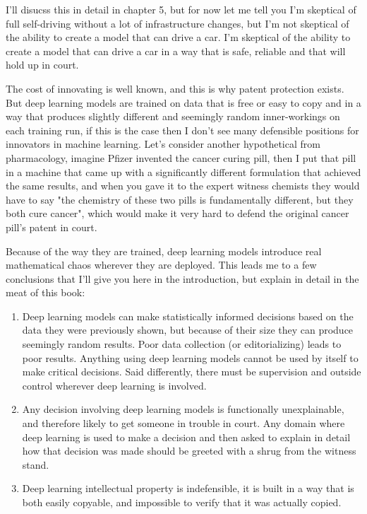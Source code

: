 I'll disucss this in detail in chapter 5, but for now let me tell you I'm skeptical of full self-driving without a lot of infrastructure changes, but I'm not skeptical of the ability to create a model that can drive a car. I'm skeptical of the ability to create a model that can drive a car in a way that is safe, reliable and that will hold up in court.   

The cost of innovating is well known, and this is why patent protection exists. But deep learning models are trained on data that is free or easy to copy and in a way that produces slightly different and seemingly random inner-workings on each training run, if this is the case then I don't see many defensible positions for innovators in machine learning. Let's consider another hypothetical from pharmacology, imagine Pfizer invented the cancer curing pill, then I put that pill in a machine that came up with a significantly different formulation that achieved the same results, and when you gave it to the expert witness chemists they would have to say "the chemistry of these two pills is fundamentally different, but they both cure cancer", which would make it very hard to defend the original cancer pill's patent in court.

Because of the way they are trained, deep learning models introduce real mathematical chaos wherever they are deployed. This leads me to a few conclusions that I'll give you here in the introduction, but explain in detail in the meat of this book: 

\begin{enumerate}
\item Deep learning models can make statistically informed decisions based on the data they were previously shown, but because of their size they can produce seemingly random results. Poor data collection (or editorializing) leads to poor results. Anything using deep learning models cannot be used by itself to make critical decisions. Said differently, there must be supervision and outside control wherever deep learning is involved.
\item Any decision involving deep learning models is functionally unexplainable, and therefore likely to get someone in trouble in court. Any domain where deep learning is used to make a decision and then asked to explain in detail how that decision was made should be greeted with a shrug from the witness stand.
\item Deep learning intellectual property is indefensible, it is built in a way that is both easily copyable, and impossible to verify that it was actually copied.
\end{enumerate}

